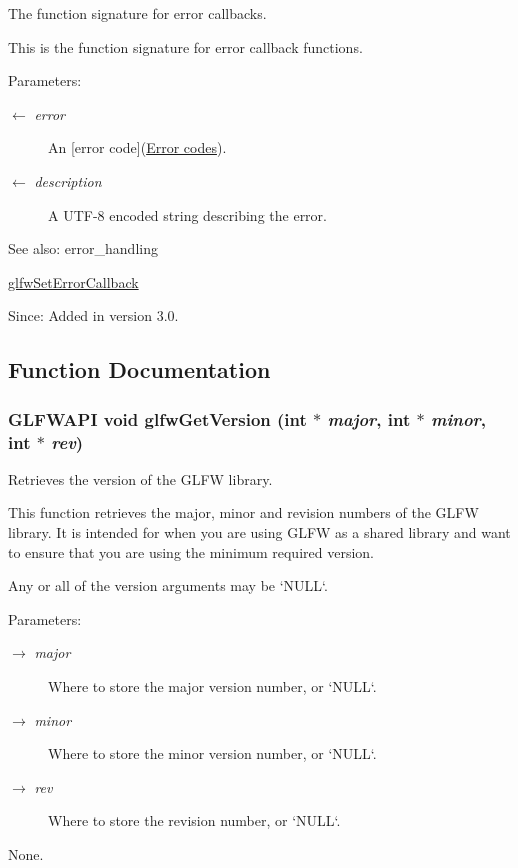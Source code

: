 The function signature for error callbacks. 

This is the function signature for error callback functions.

\begin{Desc}
\item[Parameters:]
\begin{description}
\item[\mbox{$\leftarrow$} {\em error}]An \mbox{[}error code\mbox{]}(\hyperlink{group__errors}{Error codes}). \item[\mbox{$\leftarrow$} {\em description}]A UTF-8 encoded string describing the error.\end{description}
\end{Desc}
\begin{Desc}
\item[See also:]error\_\-handling 

\hyperlink{group__init_g5919096b958c47102126061fb5a6f9c3}{glfwSetErrorCallback}\end{Desc}
\begin{Desc}
\item[Since:]Added in version 3.0. \end{Desc}


\subsection{Function Documentation}
\hypertarget{group__init_g2402c7824ac0194c13722790ff9559ff}{
\subsubsection[glfwGetVersion]{\setlength{\rightskip}{0pt plus 5cm}GLFWAPI void glfwGetVersion (int $\ast$ {\em major}, \/  int $\ast$ {\em minor}, \/  int $\ast$ {\em rev})}}
\label{group__init_g2402c7824ac0194c13722790ff9559ff}


Retrieves the version of the GLFW library. 

This function retrieves the major, minor and revision numbers of the GLFW library. It is intended for when you are using GLFW as a shared library and want to ensure that you are using the minimum required version.

Any or all of the version arguments may be `NULL`.

\begin{Desc}
\item[Parameters:]
\begin{description}
\item[\mbox{$\rightarrow$} {\em major}]Where to store the major version number, or `NULL`. \item[\mbox{$\rightarrow$} {\em minor}]Where to store the minor version number, or `NULL`. \item[\mbox{$\rightarrow$} {\em rev}]Where to store the revision number, or `NULL`.\end{description}
\end{Desc}
None.

